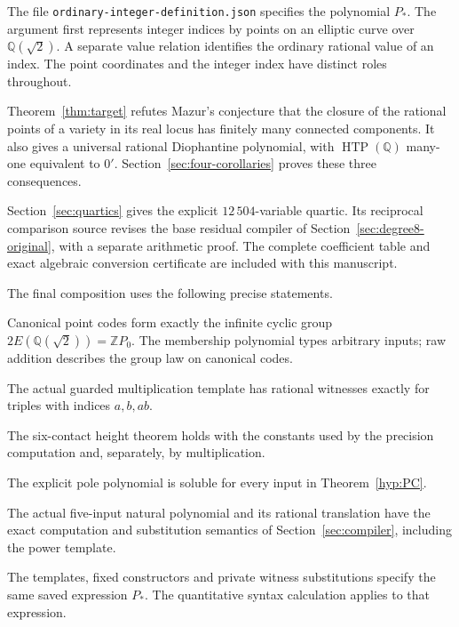 \documentclass[11pt]{article}
\theoremstyle{definition}
\theoremstyle{remark}
\newcommand{\Q}{\mathbb Q}
\newcommand{\Z}{\mathbb Z}
\begin{document}
The file \nolinkurl{ordinary-integer-definition.json} specifies the
polynomial $P_*$. The argument first represents integer indices by points
on an elliptic curve over $\Q(\sqrt2)$. A separate value relation identifies
the ordinary rational value of an index. The point coordinates and the
integer index have distinct roles throughout.

Theorem~\ref{thm:target} refutes Mazur's conjecture that the closure of
the rational points of a variety in its real locus has finitely many
connected components. It also gives a universal rational Diophantine
polynomial, with
$\operatorname{HTP}(\Q)$ many-one equivalent to $0'$.
Section~\ref{sec:four-corollaries} proves these three consequences.

Section~\ref{sec:quartics} gives the explicit $12\,504$-variable quartic.
Its reciprocal comparison source revises the base residual compiler of
Section~\ref{sec:degree8-original}, with a separate arithmetic proof.
The complete coefficient table and exact algebraic conversion certificate
are included with this manuscript.

The final composition uses the following precise statements.
\begin{description}[style=nextline,leftmargin=1.8cm]
\item[$\mathsf G$] Canonical point codes form exactly the infinite cyclic
group $2E(\Q(\sqrt2))=\Z P_0$. The membership polynomial types arbitrary inputs;
raw addition describes the group law on canonical codes.
\item[$\mathsf M$] The actual guarded multiplication template has rational
witnesses exactly for triples with indices $a,b,ab$.
\item[$\mathsf H$] The six-contact height theorem holds with the constants
used by the precision computation and, separately, by multiplication.
\item[$\mathsf{PC}$] The explicit pole polynomial is soluble for every
input in Theorem~\ref{hyp:PC}.
\item[$\mathsf C$] The actual five-input natural polynomial and its
rational translation have the exact computation and substitution semantics
of Section~\ref{sec:compiler}, including the power template.
\item[$\mathsf B$] The templates, fixed constructors and private witness
substitutions specify the same saved expression $P_*$. The quantitative
syntax calculation applies to that expression.
\end{description}
\end{document}
